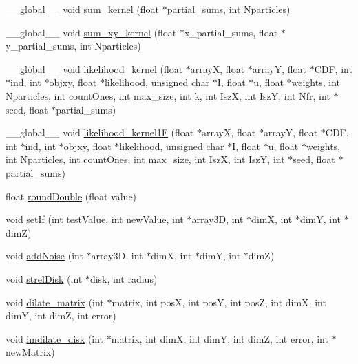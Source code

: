 \begin{DoxyCompactItemize}
\item 
\_\-\_\-global\_\-\_\- void \hyperlink{ex__particle__CUDA__float_8cu_a72476d2a032e744c6b1c5835bec5a663}{sum\_\-kernel} (float $\ast$partial\_\-sums, int Nparticles)
\item 
\_\-\_\-global\_\-\_\- void \hyperlink{ex__particle__CUDA__float_8cu_aa85678d886ca589fa6686cd2e11ebaea}{sum\_\-xy\_\-kernel} (float $\ast$x\_\-partial\_\-sums, float $\ast$y\_\-partial\_\-sums, int Nparticles)
\item 
\_\-\_\-global\_\-\_\- void \hyperlink{ex__particle__CUDA__float_8cu_af316957165b8ace93273f0b97dbdcc19}{likelihood\_\-kernel} (float $\ast$arrayX, float $\ast$arrayY, float $\ast$CDF, int $\ast$ind, int $\ast$objxy, float $\ast$likelihood, unsigned char $\ast$I, float $\ast$u, float $\ast$weights, int Nparticles, int countOnes, int max\_\-size, int k, int IszX, int IszY, int Nfr, int $\ast$seed, float $\ast$partial\_\-sums)
\item 
\_\-\_\-global\_\-\_\- void \hyperlink{ex__particle__CUDA__float_8cu_afd684a13a1604838afc867cdfe5b3c37}{likelihood\_\-kernel1F} (float $\ast$arrayX, float $\ast$arrayY, float $\ast$CDF, int $\ast$ind, int $\ast$objxy, float $\ast$likelihood, unsigned char $\ast$I, float $\ast$u, float $\ast$weights, int Nparticles, int countOnes, int max\_\-size, int IszX, int IszY, int $\ast$seed, float $\ast$partial\_\-sums)
\item 
float \hyperlink{ex__particle__CUDA__float_8cu_ae00aa7d5a2f9777fb0184ea60fd0d484}{roundDouble} (float value)
\item 
void \hyperlink{ex__particle__CUDA__float_8cu_a0ee0664eb7123e026513e7cf19ba3434}{setIf} (int testValue, int newValue, int $\ast$array3D, int $\ast$dimX, int $\ast$dimY, int $\ast$dimZ)
\item 
void \hyperlink{ex__particle__CUDA__float_8cu_aafca6f71fe327a218fe6851db25c94c5}{addNoise} (int $\ast$array3D, int $\ast$dimX, int $\ast$dimY, int $\ast$dimZ)
\item 
void \hyperlink{ex__particle__CUDA__float_8cu_a2f03f766b1c044ea6bab007e1975a23f}{strelDisk} (int $\ast$disk, int radius)
\item 
void \hyperlink{ex__particle__CUDA__float_8cu_af2a0216d5b584632a6508d5ad918734e}{dilate\_\-matrix} (int $\ast$matrix, int posX, int posY, int posZ, int dimX, int dimY, int dimZ, int error)
\item 
void \hyperlink{ex__particle__CUDA__float_8cu_a707e839d9152f9bf820dee64c6627f5b}{imdilate\_\-disk} (int $\ast$matrix, int dimX, int dimY, int dimZ, int error, int $\ast$newMatrix)

\end{DoxyCompactItemize}
